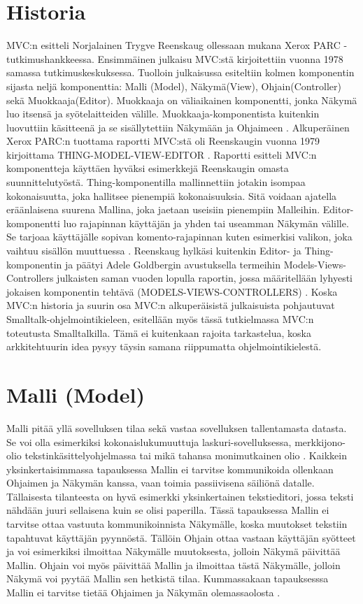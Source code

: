 \documentclass[utf8]{gradu3}
\begin{document}
\section{Historia}
MVC:n esitteli Norjalainen Trygve Reenskaug ollessaan mukana Xerox PARC -tutkimushankkeessa. 
Ensimmäinen julkaisu MVC:stä kirjoitettiin vuonna 1978 samassa tutkimuskeskuksessa. 
Tuolloin julkaisussa esiteltiin kolmen komponentin sijasta neljä komponenttia: 
Malli (Model), Näkymä(View), Ohjain(Controller) sekä Muokkaaja(Editor). Muokkaaja on 
väliaikainen komponentti, jonka Näkymä luo itsensä ja syötelaitteiden välille. 
Muokkaaja-komponentista kuitenkin luovuttiin käsitteenä ja se sisällytettiin Näkymään 
ja Ohjaimeen \parencite{xerox}. Alkuperäinen Xerox PARC:n tuottama raportti MVC:stä oli Reenskaugin 
vuonna 1979 kirjoittama THING-MODEL-VIEW-EDITOR \parencite{xerox-thing}. Raportti esitteli MVC:n 
komponentteja käyttäen hyväksi esimerkkejä Reenskaugin omasta suunnittelutyöstä. Thing-komponentilla mallinnettiin
jotakin isompaa kokonaisuutta, joka hallitsee pienempiä kokonaisuuksia. Sitä voidaan ajatella eräänlaisena suurena Mallina, joka jaetaan useisiin pienempiin Malleihin. Editor-komponentti luo rajapinnan käyttäjän ja yhden tai useamman Näkymän välille. Se tarjoaa käyttäjälle sopivan komento-rajapinnan kuten esimerkisi valikon, joka vaihtuu sisällön muuttuessa \parencite{xerox-thing}. Reenskaug hylkäsi kuitenkin Editor- ja Thing-komponentin ja  päätyi Adele Goldbergin avustuksella termeihin Models-Views-Controllers julkaisten saman vuoden lopulla raportin, jossa määritellään lyhyesti jokaisen komponentin tehtävä (MODELS-VIEWS-CONTROLLERS) \parencite{xerox-original}. Koska MVC:n historia ja suurin osa MVC:n alkuperäisistä julkaisuista pohjautuvat Smalltalk-ohjelmointikieleen, esitellään myös tässä tutkielmassa MVC:n toteutusta Smalltalkilla.
Tämä ei kuitenkaan rajoita tarkastelua, koska arkkitehtuurin idea pysyy täysin samana riippumatta ohjelmointikielestä.

\section{Malli (Model)}
Malli pitää yllä sovelluksen tilaa sekä vastaa sovelluksen tallentamasta datasta. Se voi olla esimerkiksi kokonaislukumuuttuja laskuri-sovelluksessa, merkkijono-olio tekstinkäsittelyohjelmassa tai
mikä tahansa monimutkainen olio \parencite[s. 3]{krasner_desc}. Kaikkein yksinkertaisimmassa tapauksessa Mallin ei tarvitse kommunikoida ollenkaan Ohjaimen ja Näkymän kanssa, vaan toimia passiivisena säiliönä datalle.
Tällaisesta tilanteesta on hyvä esimerkki yksinkertainen tekstieditori, jossa teksti nähdään juuri sellaisena kuin se olisi paperilla. Tässä tapauksessa Mallin ei tarvitse ottaa vastuuta
kommunikoinnista Näkymälle, koska muutokset tekstiin tapahtuvat käyttäjän pyynnöstä. Tällöin Ohjain ottaa vastaan käyttäjän syötteet ja voi esimerkiksi ilmoittaa Näkymälle muutoksesta, jolloin Näkymä
päivittää Mallin. Ohjain voi myös päivittää Mallin ja ilmoittaa tästä Näkymälle, jolloin Näkymä voi pyytää Mallin sen hetkistä tilaa. Kummassakaan tapauksesssa Mallin ei tarvitse tietää Ohjaimen ja Näkymän
olemassaolosta \parencite{burbeck}.
\end{document}
